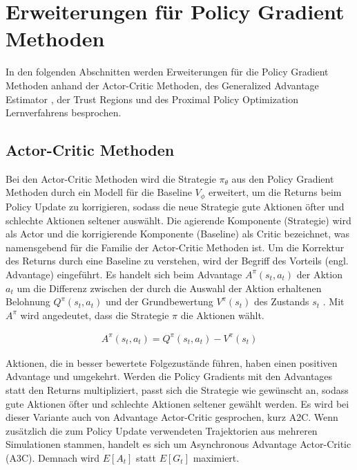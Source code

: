 \section{Erweiterungen für Policy Gradient Methoden}
In den folgenden Abschnitten werden Erweiterungen für die Policy Gradient Methoden
anhand der Actor-Critic Methoden, des Generalized Advantage Estimator \cite{schulman2018gae},
der Trust Regions \cite{schulman2017trust} und des Proximal Policy Optimization
Lernverfahrens \cite{schulman2018ppo} besprochen.

\subsection{Actor-Critic Methoden}\label{sec:ActorCritic}
Bei den Actor-Critic Methoden wird die Strategie $\pi_\theta$ aus den Policy Gradient
Methoden durch ein Modell für die Baseline $V_\phi$ erweitert, um die Returns beim
Policy Update zu korrigieren, sodass die neue Strategie gute Aktionen öfter und
schlechte Aktionen seltener auswählt.
Die agierende Komponente (Strategie) wird als Actor und die korrigierende Komponente
(Baseline) als Critic bezeichnet, was namensgebend für die Familie der Actor-Critic
Methoden ist. Um die Korrektur des Returns durch eine Baseline zu verstehen, wird der
Begriff des Vorteils (engl. Advantage) eingeführt. Es handelt sich beim Advantage
$A^\pi(s_t, a_t)$ der Aktion $a_t$ um die Differenz zwischen der durch die Auswahl
der Aktion erhaltenen Belohnung $Q^\pi(s_t, a_t)$ und der Grundbewertung $V^\pi(s_t)$
des Zustands $s_t$ \cite{schulman2018gae}. Mit $A^\pi$ wird angedeutet, dass die
Strategie $\pi$ die Aktionen wählt.

\begin{equation}
\begin{aligned}
A^\pi(s_t, a_t) = Q^\pi(s_t, a_t) - V^\pi(s_t)
\end{aligned}
\end{equation}

Aktionen, die in besser bewertete Folgezustände führen, haben einen positiven
Advantage und umgekehrt. Werden die Policy Gradients mit den Advantages statt den
Returns multipliziert, passt sich die Strategie wie gewünscht an, sodass gute Aktionen
öfter und schlechte Aktionen seltener gewählt werden. Es wird bei dieser Variante
auch von Advantage Actor-Critic gesprochen, kurz A2C. Wenn zusätzlich die zum
Policy Update verwendeten Trajektorien aus mehreren Simulationen stammen, handelt
es sich um Asynchronous Advantage Actor-Critic (A3C). Demnach wird $E[A_t]$ statt
$E[G_t]$ maximiert.\\

